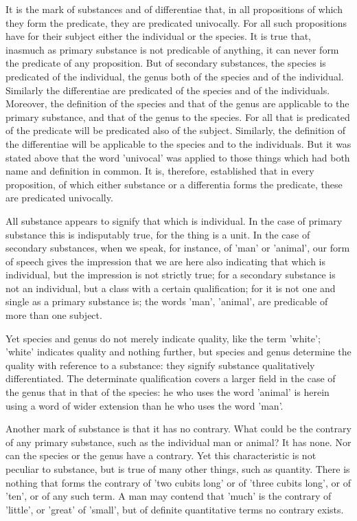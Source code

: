 It is the mark of substances and of differentiae that, in all
propositions of which they form the predicate, they are predicated
univocally. For all such propositions have for their subject either the
individual or the species. It is true that, inasmuch as primary
substance is not predicable of anything, it can never form the
predicate of any proposition. But of secondary substances, the species
is predicated of the individual, the genus both of the species and of
the individual. Similarly the differentiae are predicated of the
species and of the individuals. Moreover, the definition of the species
and that of the genus are applicable to the primary substance, and that
of the genus to the species. For all that is predicated of the
predicate will be predicated also of the subject. Similarly, the
definition of the differentiae will be applicable to the species and to
the individuals. But it was stated above that the word 'univocal' was
applied to those things which had both name and definition in common.
It is, therefore, established that in every proposition, of which
either substance or a differentia forms the predicate, these are
predicated univocally.

All substance appears to signify that which is individual. In the case
of primary substance this is indisputably true, for the thing is a
unit. In the case of secondary substances, when we speak, for instance,
of 'man' or 'animal', our form of speech gives the impression that we
are here also indicating that which is individual, but the impression
is not strictly true; for a secondary substance is not an individual,
but a class with a certain qualification; for it is not one and single
as a primary substance is; the words 'man', 'animal', are predicable of
more than one subject.

Yet species and genus do not merely indicate quality, like the term
'white'; 'white' indicates quality and nothing further, but species and
genus determine the quality with reference to a substance: they signify
substance qualitatively differentiated. The determinate qualification
covers a larger field in the case of the genus that in that of the
species: he who uses the word 'animal' is herein using a word of wider
extension than he who uses the word 'man'.

Another mark of substance is that it has no contrary. What could be the
contrary of any primary substance, such as the individual man or
animal? It has none. Nor can the species or the genus have a contrary.
Yet this characteristic is not peculiar to substance, but is true of
many other things, such as quantity. There is nothing that forms the
contrary of 'two cubits long' or of 'three cubits long', or of 'ten',
or of any such term. A man may contend that 'much' is the contrary of
'little', or 'great' of 'small', but of definite quantitative terms no
contrary exists.

